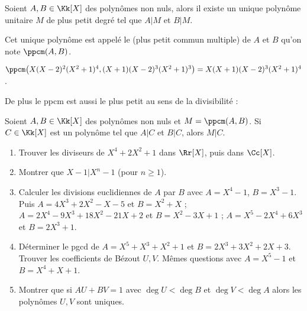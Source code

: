 \documentclass[class=report,crop=false]{standalone}
\begin{document}
\begin{proposition}
Soient $A, B\in \Kk[X]$ des polynômes non nuls, alors il existe un unique
polynôme unitaire $M$ de plus petit degré tel que $A|M$ et $B|M$.
\end{proposition}

Cet unique polynôme est appelé le 
(plus petit commun multiple) de $A$ et $B$
qu'on note $\ppcm(A,B)$.

\begin{exemple}
$\ppcm \big( X(X-2)^2(X^2+1)^4, (X+1)(X-2)^3(X^2+1)^3 \big) = X(X+1)(X-2)^3(X^2+1)^4$.
\end{exemple}


De plus le ppcm est aussi le plus petit au sens de la divisibilité :
\begin{proposition}
Soient $A, B\in\Kk[X]$ des polynômes non nuls et
$M=\ppcm(A,B)$. Si $C\in\Kk[X]$ est un polynôme tel que $A|C$ et $B|C$, alors $M|C$.
\end{proposition}




\begin{miniexercices}
\sauteligne
\begin{enumerate}
  \item Trouver les diviseurs de $X^4+2X^2+1$ dans $\Rr[X]$, puis dans $\Cc[X]$.

  \item Montrer que $X-1|X^n-1$ (pour $n\ge 1$).

  \item Calculer les divisions euclidiennes de $A$ par $B$ avec $A=X^4-1$, $B=X^3-1$.
Puis $A = 4X^3+2X^2-X-5$ et $B = X^2+X$ ; $A= 2X^4-9X^3+18X^2-21X+2$ et $B=X^2-3X+1$ ;
$A=X^ 5-2X^4+6X^3$ et $B=2X^3+1$.

  \item Déterminer le pgcd de $A=X^5+X^3+X^2+1$ et $B=2X^3+3X^2+2X+3$.
Trouver les coefficients de Bézout $U,V$.
Mêmes questions avec $A=X^5-1$ et $B=X^4+X+1$.

  \item Montrer que si $AU+BV=1$ avec $\deg U < \deg B$ et $\deg V < \deg A$
  alors les polynômes $U,V$ sont uniques.
\end{enumerate}
\end{miniexercices}
\end{document}
